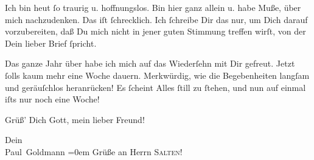 \pstart
           Ich bin heut{ }ſo traurig u. hoffnungslos. Bin hier ganz
               allein u. habe Muße, über mich nachzudenken. Das iſt{ }ſchrecklich. Ich{ }ſchreibe Dir
               das nur, um Dich darauf vorzubereiten, daß Du mich nicht in jener guten Stimmung
               treffen wirſt, von der Dein lieber Brief{ }ſpricht.\pend
           
\pstart
           {\pb}Das ganze Jahr über habe  ich mich auf das Wiederſehn mit Dir gefreut. Jetzt{ }ſolls kaum mehr eine Woche
               dauern. Merkwürdig, wie die Begebenheiten langſam und geräuſchlos heranrücken! Es{ }ſcheint Alles{ }ſtill zu{ }ſtehen, und nun auf einmal iſts nur noch eine Woche! {\dotsfive}\pend
           
\pstart
           Grüß’ Dich Gott, mein lieber Freund!\pend
           
\pstart
           Dein {\\[\baselineskip]}\spacefill\mbox{Paul Goldmann}\pend
           \leftskip=0em{}
\pstart
           \noindent{}Grüße an Herrn \textsc{Salten}!\pend
           \endnumbering{}  \newcommand{\dateiname}{L02745}\newcommand{\titel}{Paul Goldmann an Arthur Schnitzler, 19. 8. [1895]}\newcommand{\editorInnen}{Martin Anton Müller und Laura Untner}

